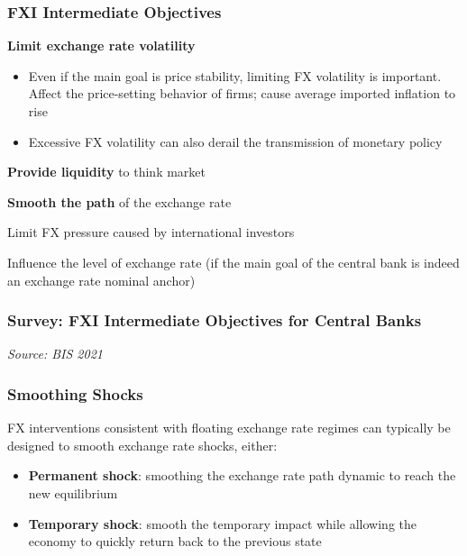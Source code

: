 \documentclass{beamer}
\newenvironment{wideitemize}{\itemize\addtolength{\itemsep}{10pt}}{\enditemize}
\begin{document}
\begin{frame}
  \frametitle{FXI Intermediate Objectives}
  \begin{wideitemize}
  \item \textbf{Limit exchange rate volatility}
    \begin{itemize}
    \item Even if the main goal is price stability, limiting FX volatility is important. Affect the price-setting behavior of firms; cause average imported inflation to rise
    \item Excessive FX volatility can also derail the transmission of monetary policy
    \end{itemize}
    \item \textbf{Provide liquidity} to think market
    \item \textbf{Smooth the path} of the exchange rate
    \item Limit FX pressure caused by international investors
    \item Influence the level of exchange rate (if the main goal of the central bank is indeed an exchange rate nominal anchor)     

  \end{wideitemize}
\end{frame}


\begin{frame}
\frametitle{Survey: FXI Intermediate Objectives for Central Banks}
\medskip
\emph{Source: BIS 2021 \href{https://www.bis.org/publ/bppdf/bispap104b_rh.pdf}{}}
\end{frame}


\begin{frame}
  \frametitle{Smoothing Shocks}
  \begin{exampleblock}{}
    FX interventions consistent with floating exchange rate regimes can typically be designed to smooth exchange rate shocks, either:
    \begin{itemize}
    \item \textbf{Permanent shock}: smoothing the exchange rate path dynamic to reach the new equilibrium 
    \item \textbf{Temporary shock}: smooth the temporary impact while allowing the economy to quickly return back to the previous state
    \end{itemize}
  \end{exampleblock}
\end{frame}
\end{document}
